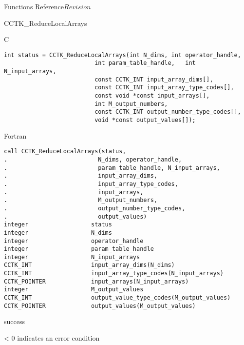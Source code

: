 \begin{cactuspart}{ Functions Reference}{}{$Revision$}
\begin{FunctionDescription}{CCTK\_ReduceLocalArrays}
\begin{SynopsisSection}
\begin{Synopsis}{C}
\begin{verbatim}
int status = CCTK_ReduceLocalArrays(int N_dims, int operator_handle,
                          int param_table_handle,   int N_input_arrays,
                          const CCTK_INT input_array_dims[],
                          const CCTK_INT input_array_type_codes[],
                          const void *const input_arrays[],
                          int M_output_numbers,
                          const CCTK_INT output_number_type_codes[],
                          void *const output_values[]);
\end{verbatim}
\end{Synopsis}
\begin{Synopsis}{Fortran}
\begin{verbatim}
call CCTK_ReduceLocalArrays(status,
.                          N_dims, operator_handle,
.                          param_table_handle, N_input_arrays,
.                          input_array_dims,
.                          input_array_type_codes,
.                          input_arrays,
.                          M_output_numbers,
.                          output_number_type_codes,
.                          output_values)
integer                  status
integer                  N_dims
integer                  operator_handle
integer                  param_table_handle
integer                  N_input_arrays
CCTK_INT                 input_array_dims(N_dims)
CCTK_INT                 input_array_type_codes(N_input_arrays)
CCTK_POINTER             input_arrays(N_input_arrays)
integer                  M_output_values
CCTK_INT                 output_value_type_codes(M_output_values)
CCTK_POINTER             output_values(M_output_values)
\end{verbatim}
\end{Synopsis}
\end{SynopsisSection}

\begin{ResultSection}
\begin{Result}{0} success \end{Result}
\begin{Result}{< 0} indicates an error condition \end{Result}
\end{ResultSection}


\end{FunctionDescription}
\end{cactuspart}
